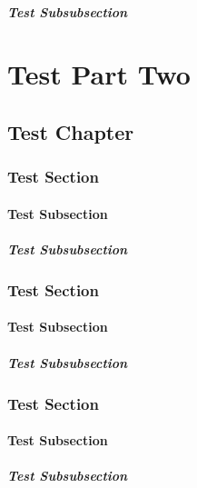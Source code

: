 \documentclass{report}
\begin{document}
\subsubsection{Test Subsubsection}

\part{Test Part Two}
\parttoc
\chapter{Test Chapter}
\section{Test Section}
\subsection{Test Subsection}
\subsubsection{Test Subsubsection}
\section{Test Section}
\subsection{Test Subsection}
\subsubsection{Test Subsubsection}
\section{Test Section}
\subsection{Test Subsection}
\subsubsection{Test Subsubsection}
\end{document}

